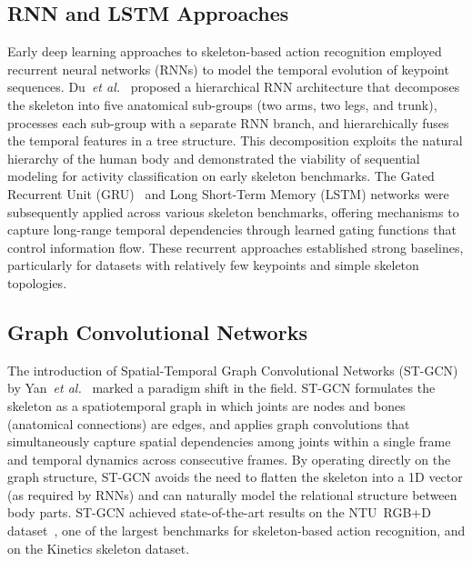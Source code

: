 \subsection*{RNN and LSTM Approaches}

Early deep learning approaches to skeleton-based action recognition employed recurrent neural networks (RNNs) to model the temporal evolution of keypoint sequences. Du~\emph{et al.}~\cite{du2015hierarchical} proposed a hierarchical RNN architecture that decomposes the skeleton into five anatomical sub-groups (two arms, two legs, and trunk), processes each sub-group with a separate RNN branch, and hierarchically fuses the temporal features in a tree structure. This decomposition exploits the natural hierarchy of the human body and demonstrated the viability of sequential modeling for activity classification on early skeleton benchmarks. The Gated Recurrent Unit (GRU)~\cite{cho2014learning} and Long Short-Term Memory (LSTM) networks were subsequently applied across various skeleton benchmarks, offering mechanisms to capture long-range temporal dependencies through learned gating functions that control information flow. These recurrent approaches established strong baselines, particularly for datasets with relatively few keypoints and simple skeleton topologies.

\subsection*{Graph Convolutional Networks}

The introduction of Spatial-Temporal Graph Convolutional Networks (ST-GCN) by Yan~\emph{et al.}~\cite{yan2018spatial} marked a paradigm shift in the field. ST-GCN formulates the skeleton as a spatiotemporal graph in which joints are nodes and bones (anatomical connections) are edges, and applies graph convolutions that simultaneously capture spatial dependencies among joints within a single frame and temporal dynamics across consecutive frames. By operating directly on the graph structure, ST-GCN avoids the need to flatten the skeleton into a 1D vector (as required by RNNs) and can naturally model the relational structure between body parts. ST-GCN achieved state-of-the-art results on the NTU~RGB+D dataset~\cite{shahroudy2016ntu}, one of the largest benchmarks for skeleton-based action recognition, and on the Kinetics skeleton dataset.

